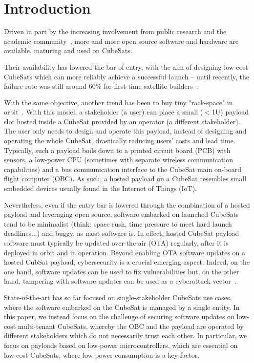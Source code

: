 \section{Introduction}
\label{sec:introduction}

Driven in part by the increasing involvement from public research and the academic
community~\cite{cubesat101}, more and more open source software and hardware are available,
maturing and used on CubeSats.

Their availability has lowered the bar of entry, with the aim of designing low-cost
CubeSats which can more reliably achieve a successful launch -- until recently, the
failure rate was still around 60\% for first-time satellite builders~\cite{Holliday2019PyCubed}.

With the same objective, another trend has been to buy tiny "rack-space" in
orbit~\cite{satrevolution2020}. With this model, a stakeholder (a user) can place
a small ($<$1U) payload slot hosted inside a CubeSat provided by an operator
(a different stakeholder). The user only needs to design and operate this payload,
instead of designing and operating the whole CubeSat, drastically reducing users'
costs and lead time. Typically, such a payload boils down to a printed circuit board
(PCB) with sensors, a low-power CPU (sometimes with separate wireless communication
capabilities) and a bus communication interface to the CubeSat main on-board flight
computer (OBC). As such, a hosted payload on a CubeSat resembles small embedded
devices usually found in the Internet of Things (IoT).

Nevertheless, even if the entry bar is lowered through the combination of a hosted payload
and leveraging open source, software embarked on launched CubeSats tend to be
minimalist (think: space rush, time pressure to meet hard launch deadlines...)
and buggy, as most software is. In effect, hosted CubeSat payload software must
typically be updated over-the-air (OTA) regularly, after it is deployed in orbit
and in operation. Beyond enabling OTA software updates on a hosted CubSat payload,
cybersecurity is a crucial emerging aspect. Indeed, on the one hand, software
updates can  be used to fix vulnerabilities but, on the other hand, tampering with
software updates can be used as a cyberattack vector~\cite{ccleaner}.

State-of-the-art has so far focused on single-stakeholder CubeSats use cases,
where the software embarked on the CubeSat is managed by a single entity. In
this paper, we instead focus on the challenge of securing software updates on low-cost
multi-tenant CubeSats, whereby the OBC and the payload are operated by different
stakeholders which do not necessarily trust each other. In particular, we focus on payloads
based on low-power microcontrollers, which are essential on low-cost CubeSats, where
low power consumption is a key factor.
